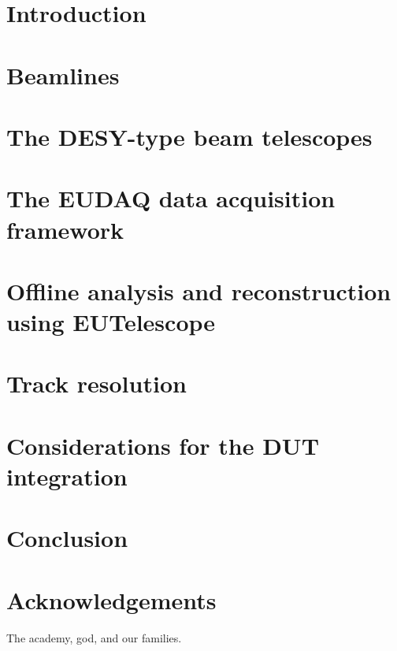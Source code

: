 \documentclass[a4paper,10pt]{scrartcl}
\begin{document}
\tableofcontents


\section{Introduction}
\label{sec:intro}


\section{Beamlines}
\label{sec:beamlines}


\section{The DESY-type beam telescopes}
\label{sec:tscope}


\section{The EUDAQ data acquisition framework}
\label{sec:eudaq}


\section{Offline analysis and reconstruction using EUTelescope}
\label{sec:offline}


\section{Track resolution}
\label{sec:trackres}


\section{Considerations for the DUT integration}
\label{sec:dutintegration}


\section{Conclusion}
\label{sec:conclusion}



\section*{Acknowledgements}
The academy, god, and our families.

\small


\end{document}
